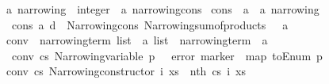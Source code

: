 \begin{isabellebody}
\isadelimdocument
%
\endisadelimdocument
%
\isatagdocument
%
\isamarkuptrue%
%
\endisatagdocument
{\isafolddocument}%
%
\isadelimdocument
%
\endisadelimdocument
{}\isamarkupfalse%
\ {\isacharprime}{\kern0pt}a\ narrowing\ {\isacharequal}{\kern0pt}\ {\isachardoublequoteopen}integer\ {\isacharequal}{\kern0pt}{\isachargreater}{\kern0pt}\ {\isacharprime}{\kern0pt}a\ narrowing{\isacharunderscore}{\kern0pt}cons{\isachardoublequoteclose}\isanewline
\isanewline
{}\isamarkupfalse%
\ cons\ {\isacharcolon}{\kern0pt}{\isacharcolon}{\kern0pt}\ {\isachardoublequoteopen}{\isacharprime}{\kern0pt}a\ {\isacharequal}{\kern0pt}{\isachargreater}{\kern0pt}\ {\isacharprime}{\kern0pt}a\ narrowing{\isachardoublequoteclose}\isanewline
{}\isanewline
\ \ {\isachardoublequoteopen}cons\ a\ d\ {\isacharequal}{\kern0pt}\ {\isacharparenleft}{\kern0pt}Narrowing{\isacharunderscore}{\kern0pt}cons\ {\isacharparenleft}{\kern0pt}Narrowing{\isacharunderscore}{\kern0pt}sum{\isacharunderscore}{\kern0pt}of{\isacharunderscore}{\kern0pt}products\ {\isacharbrackleft}{\kern0pt}{\isacharbrackleft}{\kern0pt}{\isacharbrackright}{\kern0pt}{\isacharbrackright}{\kern0pt}{\isacharparenright}{\kern0pt}\ {\isacharbrackleft}{\kern0pt}{\isacharparenleft}{\kern0pt}{\isasymlambda}{\isacharunderscore}{\kern0pt}{\isachardot}{\kern0pt}\ a{\isacharparenright}{\kern0pt}{\isacharbrackright}{\kern0pt}{\isacharparenright}{\kern0pt}{\isachardoublequoteclose}\isanewline
\isanewline
{}\isamarkupfalse%
\ conv\ {\isacharcolon}{\kern0pt}{\isacharcolon}{\kern0pt}\ {\isachardoublequoteopen}{\isacharparenleft}{\kern0pt}narrowing{\isacharunderscore}{\kern0pt}term\ list\ {\isacharequal}{\kern0pt}{\isachargreater}{\kern0pt}\ {\isacharprime}{\kern0pt}a{\isacharparenright}{\kern0pt}\ list\ {\isacharequal}{\kern0pt}{\isachargreater}{\kern0pt}\ narrowing{\isacharunderscore}{\kern0pt}term\ {\isacharequal}{\kern0pt}{\isachargreater}{\kern0pt}\ {\isacharprime}{\kern0pt}a{\isachardoublequoteclose}\isanewline
{}\isanewline
\ \ {\isachardoublequoteopen}conv\ cs\ {\isacharparenleft}{\kern0pt}Narrowing{\isacharunderscore}{\kern0pt}variable\ p\ {\isacharunderscore}{\kern0pt}{\isacharparenright}{\kern0pt}\ {\isacharequal}{\kern0pt}\ error\ {\isacharparenleft}{\kern0pt}marker\ {\isacharhash}{\kern0pt}\ map\ toEnum\ p{\isacharparenright}{\kern0pt}{\isachardoublequoteclose}\isanewline
{\isacharbar}{\kern0pt}\ {\isachardoublequoteopen}conv\ cs\ {\isacharparenleft}{\kern0pt}Narrowing{\isacharunderscore}{\kern0pt}constructor\ i\ xs{\isacharparenright}{\kern0pt}\ {\isacharequal}{\kern0pt}\ {\isacharparenleft}{\kern0pt}nth\ cs\ i{\isacharparenright}{\kern0pt}\ xs{\isachardoublequoteclose}\isanewline

\end{isabellebody}
